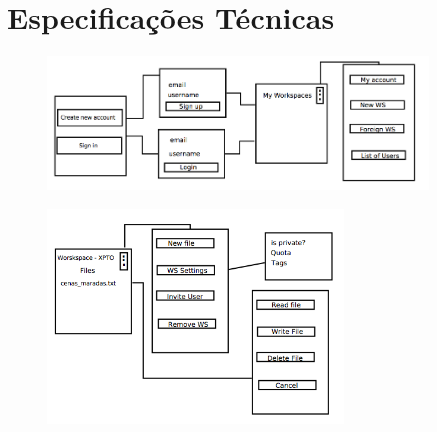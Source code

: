 \section{Especificações Técnicas}

\begin{figure}[h!]
  \centering
    \includegraphics[width=0.9\textwidth]{images/cenas1.png}
\end{figure}

\begin{figure}[h!]
  \centering
    \includegraphics[width=0.7\textwidth]{images/ola.png}
\end{figure}

